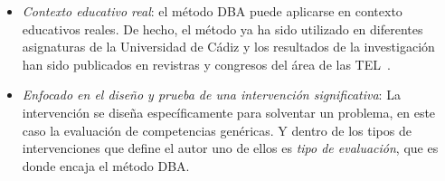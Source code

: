 \begin{itemize}
\item \emph{Contexto educativo real}: el método DBA puede aplicarse en contexto educativos reales. De hecho, el método ya ha sido utilizado en diferentes asignaturas de la Universidad de Cádiz y los resultados de la investigación han sido publicados en revistras y congresos del área de las TEL~\cite{Balderas:2012,Balderas:2013,balderas2013generative,Balderas:2015,balderas2015domain}.
\item \emph{Enfocado en el diseño y prueba de una intervención significativa}: La intervención se diseña específicamente para solventar un problema, en este caso la evaluación de competencias genéricas. Y dentro de los tipos de intervenciones que define el autor uno de ellos es \emph{tipo de evaluación}, que es donde encaja el método DBA.



\end{itemize}
